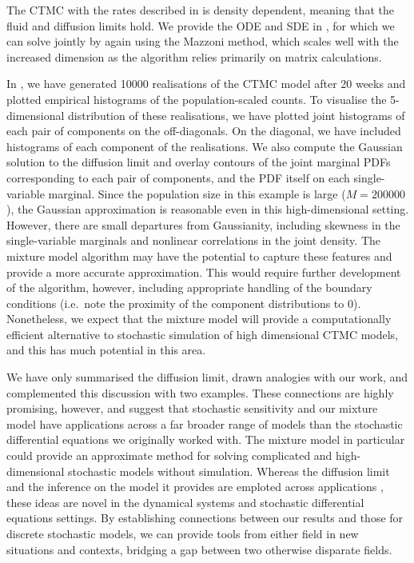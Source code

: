 The CTMC with the rates described in  is density dependent, meaning that the fluid and diffusion limits hold.
We provide the ODE and SDE in , for which we can solve jointly by again using the Mazzoni method, which scales well with the increased dimension as the algorithm relies primarily on matrix calculations.

In , we have generated 10000 realisations of the CTMC model after 20 weeks and plotted empirical histograms of the population-scaled counts.
To visualise the 5-dimensional distribution of these realisations, we have plotted joint histograms of each pair of components on the off-diagonals. On the diagonal, we have included histograms of each component of the realisations.
We also compute the Gaussian solution to the diffusion limit and overlay contours of the joint marginal PDFs corresponding to each pair of components, and the PDF itself on each single-variable marginal.
Since the population size in this example is large (\(M = 200000\)), the Gaussian approximation is reasonable even in this high-dimensional setting.
However, there are small departures from Gaussianity, including skewness in the single-variable marginals and nonlinear correlations in the joint density.
The mixture model algorithm may have the potential to capture these features and provide a more accurate approximation.
This would require further development of the algorithm, however, including appropriate handling of the boundary conditions (i.e.\ note the proximity of the component distributions to \(0\)).
Nonetheless, we expect that the mixture model will provide a computationally efficient alternative to stochastic simulation of high dimensional CTMC models, and this has much potential in this area.

We have only summarised the diffusion limit, drawn analogies with our work, and complemented this discussion with two examples.
These connections are highly promising, however, and suggest that stochastic sensitivity and our mixture model have applications across a far broader range of models than the stochastic differential equations we originally worked with.
The mixture model in particular could provide an approximate method for solving complicated and high-dimensional stochastic models without simulation.
Whereas the diffusion limit and the inference on the model it provides are emploted across applications \citep[e.g.]{PollettEtAl_2010_ModellingPopulationProcesses,Pollett_1990_ModelInterferenceSearching}, these ideas are novel in the dynamical systems and stochastic differential equations
settings.
By establishing connections between our results and those for discrete stochastic models, we can provide tools from either field in new situations and contexts, bridging a gap between two otherwise disparate fields.

